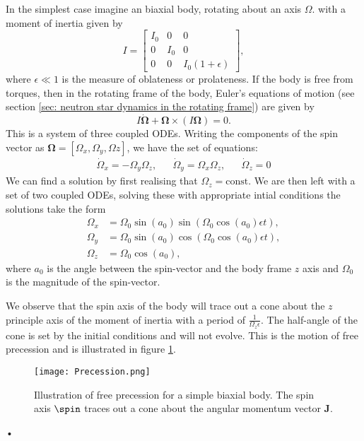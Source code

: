 In the simplest case imagine an biaxial body, 
rotating about an axis $\Omega$. with a moment of inertia given by 
\begin{equation}
    I = \left[\begin{array}{ccc}
            I_{0} & 0 & 0 \\
            0 & I_{0} & 0 \\
            0 & 0 & I_{0}(1 + \epsilon)
            \end{array}\right],
\end{equation}
where $\epsilon \ll 1$ is the measure of oblateness or prolateness.  If the
body is free from torques, then in the rotating frame of the body, Euler's
equations of motion (see section \ref{sec: neutron star dynamics in the
rotating frame}) are given by
\begin{equation}
    I\dot{\bm{\Omega}} + \bm{\Omega} \times \left(I\bm{\Omega}\right)=0.
\end{equation}
This is a system of three coupled ODEs. Writing the components of the spin
vector as $\bm{\Omega} = [\Omega_{x}, \Omega_{y}, \Omega{z}]$, we have the
set of equations:
\begin{align}
\dot{\Omega}_x = -\Omega_y\Omega_z, &&
\dot{\Omega}_y = \Omega_x \Omega_z, &&
\dot{\Omega}_z = 0
\end{align}
We can find a solution by first realising that $\Omega_{z}=\mathrm{const}$.
We are then left with a set of
two coupled ODEs, solving these with appropriate intial conditions 
the solutions take the form
\begin{align}
    \Omega_{x} & = \Omega_{0}\sin(a_0)\sin\left(\Omega_{0}\cos(a_0)\epsilon t\right), \\
    \Omega_{y} & = \Omega_{0}\sin(a_0)\cos\left(\Omega_{0}\cos(a_0)\epsilon t\right),\\
    \Omega_{z} & = \Omega_0 \cos(a_0),
\end{align}
where $a_0$ is the angle between the spin-vector and the body frame $z$ axis and
$\Omega_0$ is the magnitude of the spin-vector. 

We observe that the spin axis of the body will trace out a cone about the $z$
principle axis of the moment of inertia with a period of
$\frac{1}{\Omega_{z}\epsilon}$.  The half-angle of the cone is set by the
initial conditions and will not evolve. This is the motion of free precession
and is illustrated in figure \ref{fig: precession}. 
\begin{figure}[htb]
\centering
\texttt{[image: Precession.png]}
\caption{Illustration of free precession for a simple biaxial body. The spin
    axis $\spin$ traces out a cone about the angular momentum vector $\mathbf{J}$.}
\label{fig: precession}
\end{figure}•

